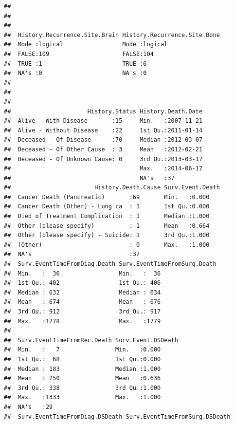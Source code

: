 \documentclass{article}\usepackage[]{graphicx}\usepackage[]{color}
\makeatletter
\newenvironment{kframe}{%
 \def\at@end@of@kframe{}%
 \ifinner\ifhmode%
  \def\at@end@of@kframe{\end{minipage}}%
  \begin{minipage}{\columnwidth}%
 \fi\fi%
 \def\FrameCommand##1{\hskip\@totalleftmargin \hskip-\fboxsep
 \colorbox{shadecolor}{##1}\hskip-\fboxsep
     \hskip-\linewidth \hskip-\@totalleftmargin \hskip\columnwidth}%
 \MakeFramed {\advance\hsize-\width
   \@totalleftmargin\z@ \linewidth\hsize
   \@setminipage}}%
 {\par\unskip\endMakeFramed%
 \at@end@of@kframe}
\newenvironment{knitrout}{}{} %
\makeatother
\begin{document}
\begin{knitrout}
\begin{kframe}
\begin{verbatim}
##                                                            
##                                                            
##                                                            
##  History.Recurrence.Site.Brain History.Recurrence.Site.Bone
##  Mode :logical                 Mode :logical               
##  FALSE:109                     FALSE:104                   
##  TRUE :1                       TRUE :6                     
##  NA's :0                       NA's :0                     
##                                                            
##                                                            
##                                                            
##                      History.Status History.Death.Date  
##  Alive - With Disease       :15     Min.   :2007-11-21  
##  Alive - Without Disease    :22     1st Qu.:2011-01-14  
##  Deceased - Of Disease      :70     Median :2012-03-07  
##  Deceased - Of Other Cause  : 3     Mean   :2012-02-21  
##  Deceased - Of Unknown Cause: 0     3rd Qu.:2013-03-17  
##                                     Max.   :2014-06-17  
##                                     NA's   :37          
##                        History.Death.Cause Surv.Event.Death
##  Cancer Death (Pancreatic)       :69       Min.   :0.000   
##  Cancer Death (Other) - Lung ca  : 1       1st Qu.:0.000   
##  Died of Treatment Complication  : 1       Median :1.000   
##  Other (please specify)          : 1       Mean   :0.664   
##  Other (please specify) - Suicide: 1       3rd Qu.:1.000   
##  (Other)                         : 0       Max.   :1.000   
##  NA's                            :37                       
##  Surv.EventTimeFromDiag.Death Surv.EventTimeFromSurg.Death
##  Min.   :  36                 Min.   :  36                
##  1st Qu.: 402                 1st Qu.: 406                
##  Median : 632                 Median : 634                
##  Mean   : 674                 Mean   : 676                
##  3rd Qu.: 912                 3rd Qu.: 917                
##  Max.   :1778                 Max.   :1779                
##                                                           
##  Surv.EventTimeFromRec.Death Surv.Event.DSDeath
##  Min.   :   7                Min.   :0.000     
##  1st Qu.:  68                1st Qu.:0.000     
##  Median : 183                Median :1.000     
##  Mean   : 250                Mean   :0.636     
##  3rd Qu.: 338                3rd Qu.:1.000     
##  Max.   :1333                Max.   :1.000     
##  NA's   :29                                    
##  Surv.EventTimeFromDiag.DSDeath Surv.EventTimeFromSurg.DSDeath

\end{verbatim}
\end{kframe}
\end{knitrout}
\end{document}
